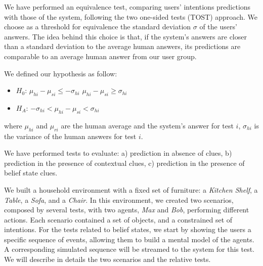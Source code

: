 We have performed an equivalence test, comparing users' intentions predictions with those of the system, following the two one-sided tests (TOST) approach. We choose as a threshold for equivalence the standard deviation $\sigma$ of the users' answers. The idea behind this choice is that, if the system's answers are closer than a standard deviation to the average human answers, its predictions are comparable to an average human answer from our user group. 

We defined our hypothesis as follow: 
\begin{itemize}
\item $H_0$: $\mu_{hi}-\mu_{si}\leq-\sigma_{hi}$ \;  \; $\mu_{hi}-\mu_{si}\geq\sigma_{hi}$ 
\item $H_A$: $-\sigma_{hi}<\mu_{hi}-\mu_{si}<\sigma_{hi}$  
\end{itemize}
where $\mu_{hi}$ and $\mu_{ri}$ are the human average and the system's answer for test $i$, $\sigma_{hi}$ is the variance of the human answers for test $i$.

We have performed tests to evaluate: a) prediction in absence of clues, b) prediction in the presence of contextual clues, c) prediction in the presence of belief state clues.

We built a household environment with a fixed set of furniture: a \textit{Kitchen Shelf}, a \textit{Table}, a \textit{Sofa}, and a \textit{Chair}. In this environment, we created two scenarios, composed by several tests, with two agents, \textit{Max} and \textit{Bob}, performing different actions. Each scenario contained a set of objects, and a constrained set of intentions. For the tests related to belief states, we start by showing the users a specific sequence of events, allowing them to build a mental model of the agents. A corresponding simulated sequence will be streamed to the system for this test.
We will describe in details the two scenarios and the relative tests.

